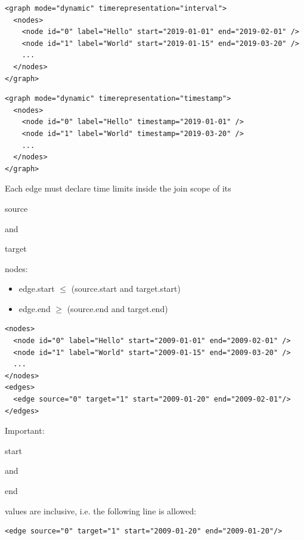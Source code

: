 \documentclass[a4paper,10pt]{article}
\begin{document}
\lstset{ style=gexf }
\begin{lstlisting}[caption={Node Scope Example with Intervals}]
<graph mode="dynamic" timerepresentation="interval">
  <nodes>
    <node id="0" label="Hello" start="2019-01-01" end="2019-02-01" />
    <node id="1" label="World" start="2019-01-15" end="2019-03-20" />
    ...
  </nodes>
</graph>
\end{lstlisting}

\lstset{ style=gexf }
\begin{lstlisting}[caption={Node Scope Example with Timestamps}]
<graph mode="dynamic" timerepresentation="timestamp">
  <nodes>
    <node id="0" label="Hello" timestamp="2019-01-01" />
    <node id="1" label="World" timestamp="2019-03-20" />
    ...
  </nodes>
</graph>
\end{lstlisting}

Each edge must declare time limits inside the join scope of its \begin{footnotesize}source\end{footnotesize} and \begin{footnotesize}target\end{footnotesize} nodes:
\begin{itemize}
 \item edge.start $\le$ (source.start and target.start)
 \item edge.end   $\ge$ (source.end   and target.end)
\end{itemize}

\lstset{ style=gexf }
\begin{lstlisting}[caption={Edge Scope Example}]
<nodes>
  <node id="0" label="Hello" start="2009-01-01" end="2009-02-01" />
  <node id="1" label="World" start="2009-01-15" end="2009-03-20" />
  ...
</nodes>
<edges>
  <edge source="0" target="1" start="2009-01-20" end="2009-02-01"/>
</edges>
\end{lstlisting}

Important: \begin{footnotesize}start\end{footnotesize} and \begin{footnotesize}end\end{footnotesize} values are inclusive, i.e. the following line is allowed:

\lstset{ style=gexf }
\begin{lstlisting}[caption={Smallest time scope}]
<edge source="0" target="1" start="2009-01-20" end="2009-01-20"/>
\end{lstlisting}
\end{document}
